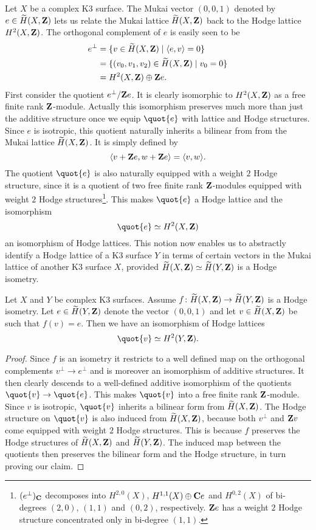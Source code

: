 Let $X$ be a complex K3 surface. The Mukai vector $(0,0,1)$ denoted by $e \in \widetilde{H}(X, \mathbf Z)$ lets us relate the Mukai lattice $\widetilde{H}(X, \mathbf Z)$ back to the Hodge lattice $H^{2}(X, \mathbf Z)$. The orthogonal complement of $e$ is easily seen to be
\begin{align*}
    e^\perp &= \{ v \in \widetilde{H}(X, \mathbf Z) \mid \langle e, v \rangle = 0\} \\
    &= \{(v_0, v_1, v_2) \in \widetilde{H}(X, \mathbf Z) \mid v_0 = 0\} \\
    &= H^{2}(X, \mathbf Z) \oplus \mathbf Z e.
\end{align*}
First consider the quotient $e^\perp / \mathbf Z e$. It is clearly isomorphic to $H^{2}(X, \mathbf Z)$ as a free finite rank $\mathbf Z$-module. Actually this isomorphism preserves much more than just the additive structure once we equip $\quot{e}$ with lattice and Hodge structures. Since $e$ is isotropic, this quotient naturally inherits a bilinear from from the Mukai lattice $\widetilde{H}(X, \mathbf Z)$. It is simply defined by
\[
    \langle v + \mathbf Z e, w + \mathbf Z e \rangle = \langle v, w \rangle.
\]
The quotient $\quot{e}$ is also naturally equipped with a weight $2$ Hodge structure, since it is a quotient of two free finite rank $\mathbf Z$-modules equipped with weight $2$ Hodge structures\footnote{
    $(e^\perp)_\mathbf C$ decomposes into $H^{2,0}(X)$, $H^{1,1}(X) \oplus \mathbf C e$ and $H^{0,2}(X)$ of bi-degrees $(2,0)$, $(1,1)$ and $(0,2)$, respectively. $\mathbf Z e$ has a weight $2$ Hodge structure concentrated only in bi-degree $(1,1)$.
}. This makes $\quot{e}$ a Hodge lattice and the isomorphism
\[
    \quot{e} \iso \cohom{2}{X}{\Z}
\]
an isomorphism of Hodge lattices. This notion now enables us to abstractly identify a Hodge lattice of a K3 surface $Y$ in terms of certain vectors in the Mukai lattice of another K3 surface $X$, provided $\widetilde{H}(X, \mathbf Z) \simeq \widetilde{H}(Y, \mathbf Z)$ is a Hodge isometry.  
\begin{proposition}
    \label{Hodge lattice described by v}
    Let $X$ and $Y$ be complex K3 surfaces. Assume $f \colon \widetilde{H}(X, \mathbf Z) \to \widetilde{H}(Y, \mathbf Z)$ is a Hodge isometry. Let $e \in \widetilde{H}(Y, \mathbf Z)$ denote the vector $(0,0,1)$ and let $v \in \widetilde{H}(X, \mathbf Z)$ be such that $f(v) = e$. Then we have an isomorphism of Hodge lattices
    \[
        \quot{v} \iso \cohom{2}{Y}{\Z}.
    \]
\end{proposition}

\begin{proof}
    Since $f$ is an isometry it restricts to a well defined map on the orthogonal complements $v^\perp \to e^\perp$ and is moreover an isomorphism of additive structures. It then clearly descends to a well-defined additive isomorphism of the quotients $\quot{v} \to \quot{e}$. This makes $\quot{v}$ into a free finite rank $\mathbf Z$-module. Since $v$ is isotropic, $\quot{v}$ inherits a bilinear form from $\widetilde{H}(X, \mathbf Z)$. The Hodge structure on $\quot{v}$ is also induced from $\widetilde{H}(X, \mathbf Z)$, because both $v^\perp$ and $\mathbf Z v$ come equipped with weight $2$ Hodge structures. This is because $f$ preserves the Hodge structures of $\widetilde{H}(X, \mathbf Z)$ and $\widetilde{H}(Y, \mathbf Z)$. The induced map between the quotients then preserves the bilinear form and the Hodge structure, in turn proving our claim. 
\end{proof}

